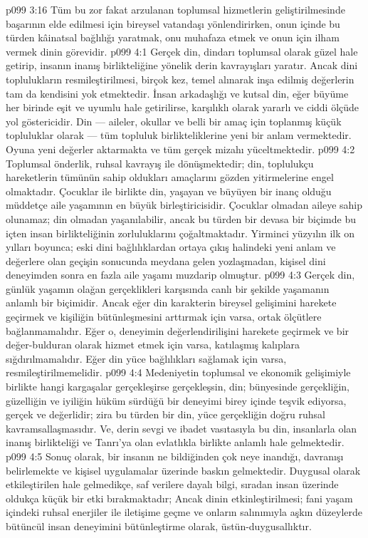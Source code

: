\vs p099 3:16 Tüm bu zor fakat arzulanan toplumsal hizmetlerin geliştirilmesinde başarının elde edilmesi için bireysel vatandaşı yönlendirirken, onun içinde bu türden kâinatsal bağlılığı yaratmak, onu muhafaza etmek ve onun için ilham vermek dinin görevidir.
\vs p099 4:1 Gerçek din, dindarı toplumsal olarak güzel hale getirip, insanın inanış birlikteliğine yönelik derin kavrayışları yaratır. Ancak dini toplulukların resmileştirilmesi, birçok kez, temel alınarak inşa edilmiş değerlerin tam da kendisini yok etmektedir. İnsan arkadaşlığı ve kutsal din, eğer büyüme her birinde eşit ve uyumlu hale getirilirse, karşılıklı olarak yararlı ve ciddi ölçüde yol göstericidir. Din --- aileler, okullar ve belli bir amaç için toplanmış küçük topluluklar olarak --- tüm topluluk birlikteliklerine yeni bir anlam vermektedir. Oyuna yeni değerler aktarmakta ve tüm gerçek mizahı yüceltmektedir.
\vs p099 4:2 Toplumsal önderlik, ruhsal kavrayış ile dönüşmektedir; din, toplulukçu hareketlerin tümünün sahip oldukları amaçlarını gözden yitirmelerine engel olmaktadır. Çocuklar ile birlikte din, yaşayan ve büyüyen bir inanç olduğu müddetçe aile yaşamının en büyük birleştiricisidir. Çocuklar olmadan aileye sahip olunamaz; din olmadan yaşanılabilir, ancak bu türden bir devasa bir biçimde bu içten insan birlikteliğinin zorluluklarını çoğaltmaktadır. Yirminci yüzyılın ilk on yılları boyunca; eski dini bağlılıklardan ortaya çıkış halindeki yeni anlam ve değerlere olan geçişin sonucunda meydana gelen yozlaşmadan, kişisel dini deneyimden sonra en fazla aile yaşamı muzdarip olmuştur.
\vs p099 4:3 Gerçek din, günlük yaşamın olağan gerçeklikleri karşısında canlı bir şekilde yaşamanın anlamlı bir biçimidir. Ancak eğer din karakterin bireysel gelişimini harekete geçirmek ve kişiliğin bütünleşmesini arttırmak için varsa, ortak ölçütlere bağlanmamalıdır. Eğer o, deneyimin değerlendirilişini harekete geçirmek ve bir değer\hyp{}bulduran olarak hizmet etmek için varsa, katılaşmış kalıplara sığdırılmamalıdır. Eğer din yüce bağlılıkları sağlamak için varsa, resmileştirilmemelidir.
\vs p099 4:4 Medeniyetin toplumsal ve ekonomik gelişimiyle birlikte hangi kargaşalar gerçekleşirse gerçekleşsin, din; bünyesinde gerçekliğin, güzelliğin ve iyiliğin hüküm sürdüğü bir deneyimi birey içinde teşvik ediyorsa, gerçek ve değerlidir; zira bu türden bir din, yüce gerçekliğin doğru ruhsal kavramsallaşmasıdır. Ve, derin sevgi ve ibadet vasıtasıyla bu din, insanlarla olan inanış birlikteliği ve Tanrı’ya olan evlatlıkla birlikte anlamlı hale gelmektedir.
\vs p099 4:5 Sonuç olarak, bir insanın ne bildiğinden çok neye inandığı, davranışı belirlemekte ve kişisel uygulamalar üzerinde baskın gelmektedir. Duygusal olarak etkileştirilen hale gelmedikçe, saf verilere dayalı bilgi, sıradan insan üzerinde oldukça küçük bir etki bırakmaktadır; Ancak dinin etkinleştirilmesi; fani yaşam içindeki ruhsal enerjiler ile iletişime geçme ve onların salınımıyla aşkın düzeylerde bütüncül insan deneyimini bütünleştirme olarak, üstün\hyp{}duygusallıktır.
